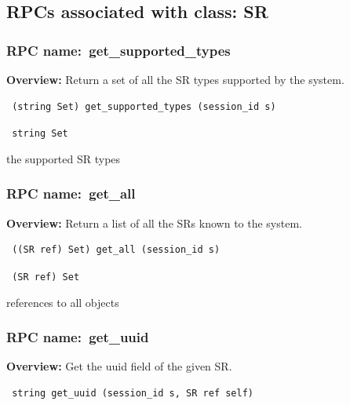 \subsection{RPCs associated with class: SR}
\subsubsection{RPC name:~get\_supported\_types}

{\bf Overview:} 
Return a set of all the SR types supported by the system.

\begin{verbatim} (string Set) get_supported_types (session_id s)\end{verbatim}


\vspace{0.3cm}

{\tt 
string Set
}


the supported SR types
\vspace{0.3cm}
\vspace{0.3cm}
\vspace{0.3cm}
\subsubsection{RPC name:~get\_all}

{\bf Overview:} 
Return a list of all the SRs known to the system.

\begin{verbatim} ((SR ref) Set) get_all (session_id s)\end{verbatim}


\vspace{0.3cm}

{\tt 
(SR ref) Set
}


references to all objects
\vspace{0.3cm}
\vspace{0.3cm}
\vspace{0.3cm}
\subsubsection{RPC name:~get\_uuid}

{\bf Overview:} 
Get the uuid field of the given SR.

\begin{verbatim} string get_uuid (session_id s, SR ref self)\end{verbatim}


